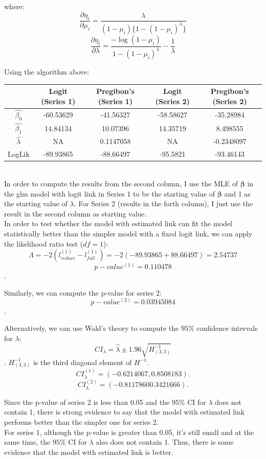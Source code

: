 \documentclass[12pt]{article}
\begin{document}
where: 
$$\frac{\partial \eta_i}{\partial \mu_i} = \frac{\lambda}{(1-\mu_i)\{ 1 - (1-\mu_i)^{\lambda}  \}}$$
$$\frac{\partial \eta_i}{\partial \lambda} = \frac{-\log(1-\mu_i)}{1 - (1-\mu_i)^{\lambda}}-\frac{1}{\lambda}$$

Using the algorithm above:

\begin{tabular}{|c|cccc|}
\hline
 & Logit (Series 1) & Pregibon's (Series 1) & Logit (Series 2) & Pregibon's (Series 2)\\
 \hline
$\hat{\beta_0}$ & -60.53629 & -41.56327 & -58.58627 & -35.28984 \\
$\hat{\beta_1}$ & 14.84134 & 10.07396 & 14.35719 & 8.498555 \\
$\hat{\lambda}$ & NA & 0.1147058 & NA & -0.2348097 \\
LogLik & -89.93865 & -88.66497  & -95.5821 & -93.46143\\
\hline
\end{tabular}
\\

In order to compute the results from the second column, I use the MLE of $\pmb{\beta}$ in the glm model with logit link in Series 1 to be the starting value of $\pmb{\beta}$ and 1 as the starting value of $\lambda$. For Series 2 (results in the forth column), I just use the result in the second column as starting value.\\


In order to test whether the model with estimated link can fit the model statistically better than the simpler model with a fixed logit link, we can apply the likelihood ratio test ($df = 1$):
$$\Lambda = -2 (l_{reduce}^{(1)} - l_{full}^{(1)}) = -2 (-89.93865 + 88.66497 ) = 2.54737$$
$$p-value^{(1)}= 0.110478$$.

Similarly, we can compute the p-value for series 2: 
$$p-value^{(2)}= 0.03945084$$.

Alternatively, we can use Wald's theory to compute the $95\%$ confidence intervals for $\lambda$:  
$$CI_{\lambda} = \hat{\lambda} \pm 1.96\sqrt{H^{-1}_{(3,3)}}$$. 
$H^{-1}_{(3,3)}$ is the third diagonal element of $H^{-1}$. 
$$CI_{\lambda}^{(1)} = (-0.6214067,  0.8508183).$$
$$CI_{\lambda}^{(2)} = (-0.8117860  0.3421666).$$

Since the p-value of series 2 is less than 0.05 and the $95\%$ CI for $\lambda$ does not contain 1,  there is strong evidence to say that the model with estimated link performs better than the simpler one for series 2.\\
  For series 1, although the p-value is greater than 0.05, it's still small and at the same time, the $95\%$ CI for $\lambda$ also does not contain 1. Thus, there is some evidence that the model with estimated link is better.
\end{document}
